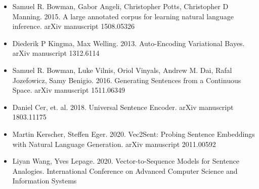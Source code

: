 \documentclass[11pt]{article}
\begin{document}
\begin{itemize}
\item Samuel R. Bowman, Gabor Angeli, Christopher Potts, Christopher D Manning. 2015. A large annotated corpus for learning natural language inference. arXiv manuscript 1508.05326
\item Diederik P Kingma, Max Welling. 2013. Auto-Encoding Variational Bayes. arXiv manuscript 1312.6114
\item Samuel R. Bowman, Luke Vilnis, Oriol Vinyals, Andrew M. Dai, Rafal Jozefowicz, Samy Benigio. 2016. Generating Sentences from a Continuous Space. arXiv manuscript 1511.06349
\item Daniel Cer, et. al. 2018. Universal Sentence Encoder. arXiv manuscript 1803.11175
\item Martin Kerscher, Steffen Eger. 2020. Vec2Sent: Probing Sentence Embeddings with Natural Language Generation. arXiv manuscript 2011.00592
\item Liyan Wang, Yves Lepage. 2020. Vector-to-Sequence Models for Sentence Analogies. International Conference on Advanced Computer Science and Information Systems
\end{itemize}
\end{document}
